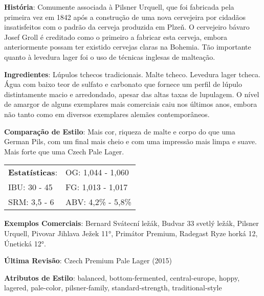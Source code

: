 \textbf{História}: Comumente associada à Pilsner Urquell, que foi fabricada pela primeira vez em 1842 após a construção de uma nova cervejeira por cidadãos insatisfeitos com o padrão da cerveja produzida em Plzeň. O cervejeiro bávaro Josef Groll é creditado como o primeiro a fabricar esta cerveja, embora anteriormente possam ter existido cervejas claras na Bohemia. Tão importante quanto à levedura lager foi o uso de técnicas inglesas de malteação.

\textbf{Ingredientes}: Lúpulos tchecos tradicionais. Malte tcheco. Levedura lager tcheca. Água com baixo teor de sulfato e carbonato que fornece um perfil de lúpulo distintamente macio e arredondado, apesar das altas taxas de lupulagem. O nível de amargor de alguns exemplares mais comerciais caiu nos últimos anos, embora não tanto como em diversos exemplares alemães contemporâneos.

\textbf{Comparação de Estilo}: Mais cor, riqueza de malte e corpo do que uma German Pils, com um final mais cheio e com uma impressão mais limpa e suave. Mais forte que uma Czech Pale Lager.

\begin{tabular}{@{}p{35mm}p{35mm}@{}}
  \textbf{Estatísticas}: & OG: 1,044 - 1,060 \\
  IBU: 30 - 45  & FG: 1,013 - 1,017  \\
  SRM: 3,5 - 6  & ABV: 4,2\% - 5,8\%
\end{tabular}

\textbf{Exemplos Comerciais}: Bernard Svátecní ležák, Budvar 33 svetlý ležák, Pilsner Urquell, Pivovar Jihlava Ježek 11°, Primátor Premium, Radegast Ryze horká 12, Únetická 12°.

\textbf{Última Revisão}: Czech Premium Pale Lager (2015)

\textbf{Atributos de Estilo}: balanced, bottom-fermented, central-europe, hoppy, lagered, pale-color, pilsner-family, standard-strength, traditional-style
